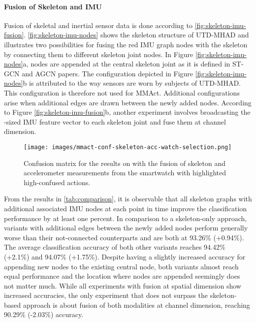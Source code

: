 \paragraph{Fusion of Skeleton and IMU}

Fusion of skeletal and inertial sensor data is done according to \figname\ref{fig:skeleton-imu-fusion}. \figname\ref{fig:skeleton-imu-nodes} shows the skeleton structure of UTD-MHAD and illustrates two possibilities for fusing the red IMU graph nodes with the skeleton by connecting them to different skeleton joint nodes. In Figure \ref{fig:skeleton-imu-nodes}a, nodes are appended at the central skeleton joint as it is defined in ST-GCN and AGCN papers. The configuration depicted in Figure \ref{fig:skeleton-imu-nodes}b is attributed to the way sensors are worn by subjects of UTD-MHAD. This configuration is therefore not used for MMAct. 
Additional configurations arise when additional edges are drawn between the newly added nodes. According to Figure \ref{fig:skeleton-imu-fusion}b, another experiment involves broadcasting the -sized IMU feature vector to each skeleton joint and fuse them at channel dimension.
\begin{wrapfigure}[13]{r}{0.5\textwidth}
    \centering
    \texttt{[image: images/mmact-conf-skeleton-acc-watch-selection.png]}
    \caption{Confusion matrix for the results on \mmact{} with the fusion of skeleton and accelerometer measurements from the smartwatch with highlighted high-confused actions.}
    \label{fig:mmact_confusion}
\end{wrapfigure}
From the results in \tabname\ref{tab:comparison}, it is observable that all skeleton graphs with additional associated IMU nodes at each point in time improve the classification performance by at least one percent. In comparison to a skeleton-only approach, variants with additional edges between the newly added nodes perform generally worse than their not-connected counterparts and are both at 93.26\% (+0.94\%). The average classification accuracy of both other variants reaches 94.42\% (+2.1\%) and 94.07\% (+1.75\%). Despite having a slightly increased accuracy for appending new nodes to the existing central node, both variants almost reach equal performance and the location where nodes are appended seemingly does not matter much. While all experiments with fusion at spatial dimension show increased accuracies, the only experiment that does not surpass the skeleton-based approach is about fusion of both modalities at channel dimension, reaching 90.29\% (-2.03\%) accuracy.

